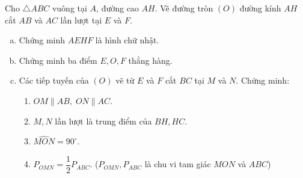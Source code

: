 \begin{bt}%
	Cho $\triangle ABC$ vuông tại $A$, đường cao $AH$. Vẽ đường tròn $(O)$ đường kính $AH$ cắt $AB$ và $AC$ lần lượt tại $E$ và $F$.
	\begin{enumerate}[a)]
		\item Chứng minh $AEHF$ là hình chữ nhật.
		\item Chứng minh ba điểm $E, O, F$ thẳng hàng.
		\item Các tiếp tuyến của $(O)$ vẽ từ $E$ và $F$ cắt $BC$ tại $M$ và $N$. Chứng minh:
		\begin{enumerate}[1)]
			\item $OM \parallel AB,\; ON \parallel AC$.
			\item $M, N$ lần lượt là trung điểm của $BH, HC$.
			\item $\widehat{MON} = 90^\circ$.
			\item $P_{OMN}=\dfrac{1}{2}P_{ABC}$. ($P_{OMN}, P_{ABC}$ là chu vi tam giác $MON$ và $ABC$)
		\end{enumerate}
	\end{enumerate}
\end{bt}
